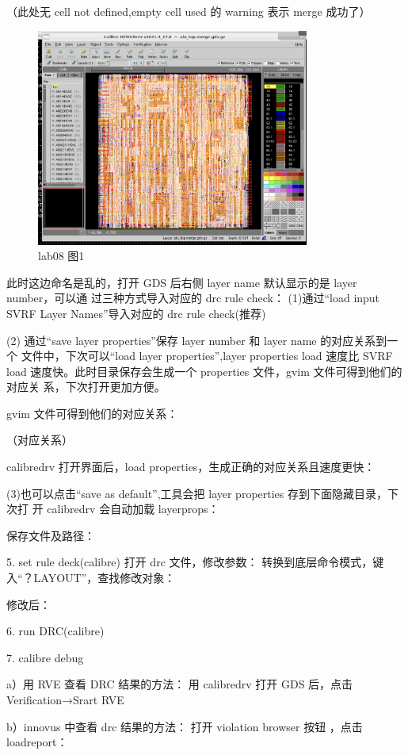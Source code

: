 （此处无 cell not defined,empty cell used 的 warning 表示 merge 成功了）

\begin{figure}[H]
    \centering
    \includegraphics[width=0.8\textwidth]{images/lab08-01.png}
    \caption{lab08 图1}
\end{figure}

此时这边命名是乱的，打开 GDS 后右侧 layer name 默认显示的是 layer number，可以通 过三种方式导入对应的 drc rule check： (1)通过“load input SVRF Layer Names”导入对应的 drc rule check(推荐)

(2) 通过“save layer properties”保存 layer number 和 layer name 的对应关系到一个 文件中，下次可以“load layer properties”,layer properties load 速度比 SVRF load 速度快。此时目录保存会生成一个 properties 文件，gvim 文件可得到他们的对应关 系，下次打开更加方便。

gvim 文件可得到他们的对应关系：

（对应关系）

calibredrv 打开界面后，load properties，生成正确的对应关系且速度更快：

(3)也可以点击“save as default”,工具会把 layer properties 存到下面隐藏目录，下次打 开 calibredrv 会自动加载 layerprops：

保存文件及路径：

5. set rule deck(calibre) 打开 drc 文件，修改参数： 转换到底层命令模式，键入“？LAYOUT”，查找修改对象：

修改后：

6. run DRC(calibre)

7. calibre debug

a）用 RVE 查看 DRC 结果的方法： 用 calibredrv 打开 GDS 后，点击 Verification→Srart RVE

b）innovus 中查看 drc 结果的方法： 打开 violation browser 按钮 ，点击 loadreport：


